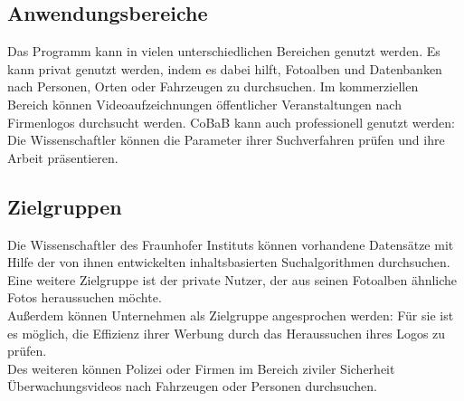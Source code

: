 \subsection{Anwendungsbereiche}

Das Programm kann in vielen unterschiedlichen Bereichen genutzt werden. Es kann privat genutzt werden, indem es dabei hilft, Fotoalben und Datenbanken nach Personen, Orten oder Fahrzeugen zu durchsuchen.
Im kommerziellen Bereich können Videoaufzeichnungen öffentlicher Veranstaltungen nach Firmenlogos durchsucht werden.
CoBaB kann auch professionell genutzt werden: Die Wissenschaftler können die Parameter ihrer Suchverfahren prüfen und ihre Arbeit präsentieren.

\subsection{Zielgruppen}

Die Wissenschaftler des Fraunhofer Instituts können vorhandene Datensätze mit Hilfe der von ihnen entwickelten inhaltsbasierten Suchalgorithmen durchsuchen.\\
Eine weitere Zielgruppe ist der private Nutzer, der aus seinen Fotoalben ähnliche Fotos heraussuchen möchte.\\
Außerdem können Unternehmen als Zielgruppe angesprochen werden: Für sie ist es möglich, die Effizienz ihrer Werbung durch das Heraussuchen ihres Logos zu prüfen.\\
Des weiteren können Polizei oder Firmen im Bereich ziviler Sicherheit Überwachungsvideos nach Fahrzeugen oder Personen durchsuchen.
\pagebreak